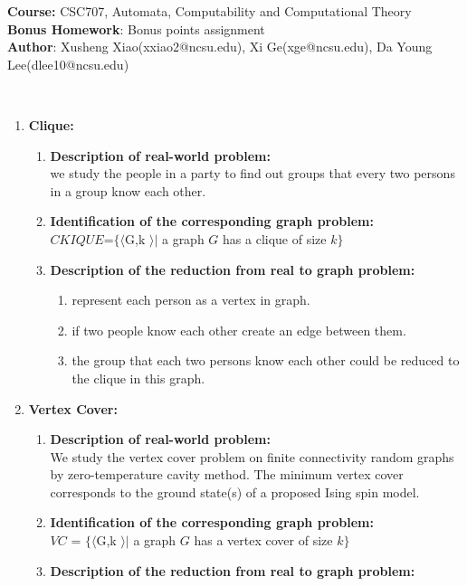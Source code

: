 \documentclass[article, 10pt,onecolumn]{article}
\begin{document}
\begin{flushleft}
\textbf{Course:} CSC707, Automata, Computability and Computational Theory\\
\textbf{Bonus Homework}: Bonus points assignment\\
\textbf{Author}: Xusheng Xiao(\small{xxiao2@ncsu.edu}), Xi Ge(\small{xge@ncsu.edu}), Da Young Lee(\small{dlee10@ncsu.edu})\\
\end{flushleft}

\begin{center}
\\
\end{center}
\noindent{\hrulefill}
\begin{enumerate}
\item \textbf{Clique:}
	\begin{enumerate}
	\item\textbf{Description of real-world problem:}\\ 
   we study the people in a party to find out groups that every two persons in a group know each other. 
  \item \textbf{Identification of the corresponding graph problem:}\\
  $CKIQUE$=$\{\langle $G,k $ \rangle | $ a graph $G$ has a clique of size $k\}$ 
  \item \textbf{Description of the reduction from real to graph problem:}
  	\begin{enumerate}
		\item represent each person as a vertex in graph.
		\item if two people know each other create an edge between them.
		\item the group that each two persons know each other could be reduced to the clique in this graph.
		\end{enumerate}
	\end{enumerate}	  
\item \textbf{Vertex Cover:}
  \begin{enumerate}
   \item \textbf{Description of real-world problem:}\\
    We study the vertex cover problem on finite connectivity random graphs by zero-temperature cavity method. The minimum vertex cover
    corresponds to the ground state(s) of a proposed Ising spin model.\cite{Vertex}
   \item \textbf{Identification of the corresponding graph problem:}\\
    $VC$ = $\{\langle $G,k $ \rangle | $ a graph $G$ has a vertex cover of size $k\}$
   \item \textbf{Description of the reduction from real to graph problem:}\\
  \end{enumerate}


\end{enumerate}
\end{document}

